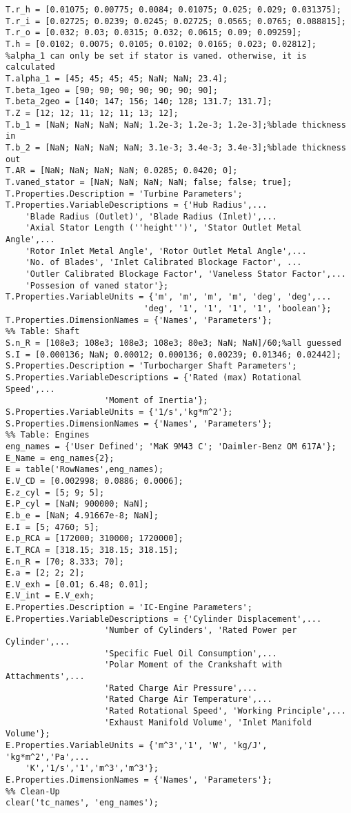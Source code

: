 \begin{lstlisting}[caption={[Geometry parameter tables]Tables holding geometry parameters, \iecfeg{cf.}\ \cref{ch:geometric_similitude,tab:turbine_geometry,tab:compressor_geometry}}, label={matlab:geometry_tables}]
T.r_h = [0.01075; 0.00775; 0.0084; 0.01075; 0.025; 0.029; 0.031375];
T.r_i = [0.02725; 0.0239; 0.0245; 0.02725; 0.0565; 0.0765; 0.088815];
T.r_o = [0.032; 0.03; 0.0315; 0.032; 0.0615; 0.09; 0.09259];
T.h = [0.0102; 0.0075; 0.0105; 0.0102; 0.0165; 0.023; 0.02812];
%alpha_1 can only be set if stator is vaned. otherwise, it is calculated
T.alpha_1 = [45; 45; 45; 45; NaN; NaN; 23.4];
T.beta_1geo = [90; 90; 90; 90; 90; 90; 90];
T.beta_2geo = [140; 147; 156; 140; 128; 131.7; 131.7];
T.Z = [12; 12; 11; 12; 11; 13; 12];
T.b_1 = [NaN; NaN; NaN; NaN; 1.2e-3; 1.2e-3; 1.2e-3];%blade thickness in
T.b_2 = [NaN; NaN; NaN; NaN; 3.1e-3; 3.4e-3; 3.4e-3];%blade thickness out
T.AR = [NaN; NaN; NaN; NaN; 0.0285; 0.0420; 0];
T.vaned_stator = [NaN; NaN; NaN; NaN; false; false; true];
T.Properties.Description = 'Turbine Parameters';
T.Properties.VariableDescriptions = {'Hub Radius',...
    'Blade Radius (Outlet)', 'Blade Radius (Inlet)',...
    'Axial Stator Length (''height'')', 'Stator Outlet Metal Angle',...
    'Rotor Inlet Metal Angle', 'Rotor Outlet Metal Angle',...
    'No. of Blades', 'Inlet Calibrated Blockage Factor', ...
    'Outler Calibrated Blockage Factor', 'Vaneless Stator Factor',...
    'Possesion of vaned stator'};
T.Properties.VariableUnits = {'m', 'm', 'm', 'm', 'deg', 'deg',...
                            'deg', '1', '1', '1', '1', 'boolean'};
T.Properties.DimensionNames = {'Names', 'Parameters'};
%% Table: Shaft
S.n_R = [108e3; 108e3; 108e3; 108e3; 80e3; NaN; NaN]/60;%all guessed
S.I = [0.000136; NaN; 0.00012; 0.000136; 0.00239; 0.01346; 0.02442];
S.Properties.Description = 'Turbocharger Shaft Parameters';
S.Properties.VariableDescriptions = {'Rated (max) Rotational Speed',...
                    'Moment of Inertia'};
S.Properties.VariableUnits = {'1/s','kg*m^2'};
S.Properties.DimensionNames = {'Names', 'Parameters'};
%% Table: Engines
eng_names = {'User Defined'; 'MaK 9M43 C'; 'Daimler-Benz OM 617A'};
E_Name = eng_names{2};
E = table('RowNames',eng_names);
E.V_CD = [0.002998; 0.0886; 0.0006];
E.z_cyl = [5; 9; 5];
E.P_cyl = [NaN; 900000; NaN];
E.b_e = [NaN; 4.91667e-8; NaN];
E.I = [5; 4760; 5];
E.p_RCA = [172000; 310000; 1720000];
E.T_RCA = [318.15; 318.15; 318.15];
E.n_R = [70; 8.333; 70];
E.a = [2; 2; 2];
E.V_exh = [0.01; 6.48; 0.01];
E.V_int = E.V_exh;
E.Properties.Description = 'IC-Engine Parameters';
E.Properties.VariableDescriptions = {'Cylinder Displacement',...
                    'Number of Cylinders', 'Rated Power per Cylinder',...
                    'Specific Fuel Oil Consumption',...
                    'Polar Moment of the Crankshaft with Attachments',...
                    'Rated Charge Air Pressure',...
                    'Rated Charge Air Temperature',...
                    'Rated Rotational Speed', 'Working Principle',...
                    'Exhaust Manifold Volume', 'Inlet Manifold Volume'};
E.Properties.VariableUnits = {'m^3','1', 'W', 'kg/J', 'kg*m^2','Pa',...
    'K','1/s','1','m^3','m^3'};
E.Properties.DimensionNames = {'Names', 'Parameters'};
%% Clean-Up
clear('tc_names', 'eng_names');
\end{lstlisting}
\fi

